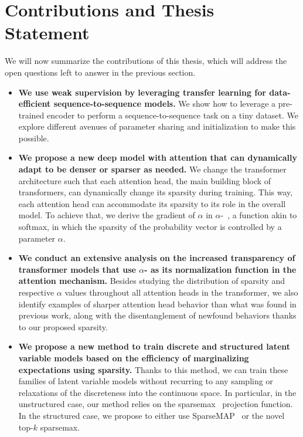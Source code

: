 \section{Contributions and Thesis Statement}
\label{sec:int_contributions}

\noindent We will now summarize the contributions of this thesis, which will
address the open questions left to answer in the previous section.

\begin{itemize}

      \item \textbf{We use weak supervision by leveraging transfer learning
                  for data-efficient sequence-to-sequence models.} We show how to
            leverage a pre-trained encoder to perform a
            sequence-to-sequence task on a tiny dataset. We explore different
            avenues of parameter sharing and initialization to make this
            possible.


      \item \textbf{We propose a new deep model with attention that can
                  dynamically adapt to be denser or sparser as needed.} We change the
            transformer architecture such that each attention head, the main
            building block of transformers, can dynamically change its sparsity
            during training. This way, each attention head can accommodate its
            sparsity to its role in the overall model. To achieve that, we derive
            the gradient of $\alpha$ in $\alpha$-\entmaxtext{}~\citep{entmax}, a
            function akin to softmax, in which the sparsity of the probability
            vector is controlled by a parameter $\alpha$.

      \item \textbf{We conduct an extensive analysis on the increased
                  transparency of transformer models that use {\boldmath
                              $\alpha$}-\entmaxtext{} as its normalization function in the
                  attention mechanism.}
            Besides studying the distribution of sparsity and respective $\alpha$ values
            throughout all attention heads in the transformer, we also identify
            examples of sharper attention head behavior than what was found in
            previous work, along with the disentanglement of newfound behaviors
            thanks to our proposed sparsity.

      \item \textbf{We propose a new method to train discrete and
                  structured latent variable models based on the efficiency of
                  marginalizing expectations using sparsity.} Thanks to this method, we
            can train these families of latent variable models without recurring
            to any sampling or relaxations of the discreteness into
            the continuous space. In particular, in the unstructured case, our
            method relies on the sparsemax~\citep{sparsemax} projection function.
            In the structured case, we propose to either use
            SparseMAP~\citep{niculae2018sparsemap} or the novel top-$k$
            sparsemax.


\end{itemize}
